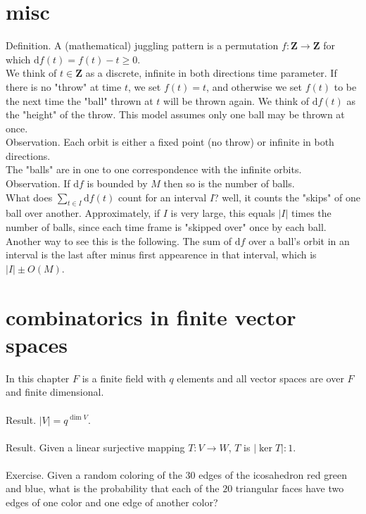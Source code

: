 \documentclass[english]{article}
\def\d{\text{d}}
\renewcommand\to{\longrightarrow}
\def\Z{\mathbf{Z}}
\newcommand\abs[1]{\left|#1\right|}
\begin{document}
\section*{misc}
Definition. A (mathematical) juggling pattern is a permutation $f:\Z\to\Z$ for which $\d f(t)=f(t)-t\ge 0$.\\


We think of $t\in \Z$ as a discrete, infinite in both directions time parameter. If there is no "throw" at time $t$, we set $f(t)=t$, and otherwise we set $f(t)$ to be the next time the "ball" thrown at $t$ will be thrown again. We think of $\d f(t)$ as the "height" of the throw. This model assumes only one ball may be thrown at once.\\


Observation. Each orbit is either a fixed point (no throw) or infinite in both directions.\\


The "balls" are in one to one correspondence with the infinite orbits.\\


Observation. If $\d f$ is bounded by $M$ then so is the number of balls.\\


What does $\sum_{t\in I}\d f(t)$ count for an interval $I$? well, it counts the "skips" of one ball over another. Approximately, if $I$ is very large, this equals $\abs{I}$ times the number of balls, since each time frame is "skipped over" once by each ball. Another way to see this is the following. The sum of $\d f$ over a ball's orbit in an interval is the last after minus first appearence in that interval, which is $|I| \pm O(M)$.

\section*{combinatorics in finite vector spaces}
In this chapter $F$ is a finite field with $q$ elements and all vector spaces are over $F$ and finite dimensional.\\\\


Result. $\abs{V}=q^{\dim V}$.\\\\


Result. Given a linear surjective mapping $T:V\to W$, $T$ is $\abs{\ker T}:1$.\\\\


Exercise. Given a random coloring of the $30$ edges of the icosahedron red green and blue, what is the probability that each of the $20$ triangular faces have two edges of one color and one edge of another color?\\\\
\end{document}
